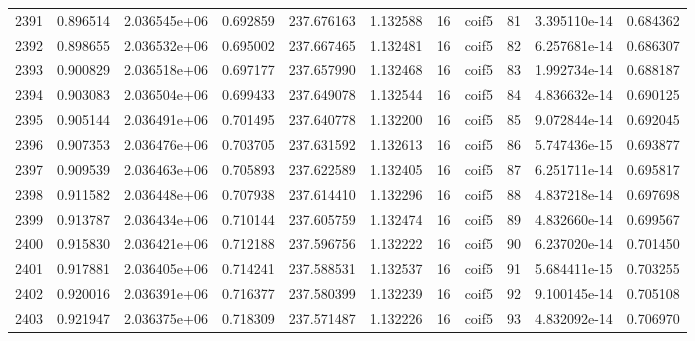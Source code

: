 \begin{tabular}{lrrrrrrlrrr}
2391 &    0.896514 &        2.036545e+06 &  0.692859 &              237.676163 &    1.132588 &      16 &        coif5 &     81 &   3.395110e-14 &      0.684362 \\
2392 &    0.898655 &        2.036532e+06 &  0.695002 &              237.667465 &    1.132481 &      16 &        coif5 &     82 &   6.257681e-14 &      0.686307 \\
2393 &    0.900829 &        2.036518e+06 &  0.697177 &              237.657990 &    1.132468 &      16 &        coif5 &     83 &   1.992734e-14 &      0.688187 \\
2394 &    0.903083 &        2.036504e+06 &  0.699433 &              237.649078 &    1.132544 &      16 &        coif5 &     84 &   4.836632e-14 &      0.690125 \\
2395 &    0.905144 &        2.036491e+06 &  0.701495 &              237.640778 &    1.132200 &      16 &        coif5 &     85 &   9.072844e-14 &      0.692045 \\
2396 &    0.907353 &        2.036476e+06 &  0.703705 &              237.631592 &    1.132613 &      16 &        coif5 &     86 &   5.747436e-15 &      0.693877 \\
2397 &    0.909539 &        2.036463e+06 &  0.705893 &              237.622589 &    1.132405 &      16 &        coif5 &     87 &   6.251711e-14 &      0.695817 \\
2398 &    0.911582 &        2.036448e+06 &  0.707938 &              237.614410 &    1.132296 &      16 &        coif5 &     88 &   4.837218e-14 &      0.697698 \\
2399 &    0.913787 &        2.036434e+06 &  0.710144 &              237.605759 &    1.132474 &      16 &        coif5 &     89 &   4.832660e-14 &      0.699567 \\
2400 &    0.915830 &        2.036421e+06 &  0.712188 &              237.596756 &    1.132222 &      16 &        coif5 &     90 &   6.237020e-14 &      0.701450 \\
2401 &    0.917881 &        2.036405e+06 &  0.714241 &              237.588531 &    1.132537 &      16 &        coif5 &     91 &   5.684411e-15 &      0.703255 \\
2402 &    0.920016 &        2.036391e+06 &  0.716377 &              237.580399 &    1.132239 &      16 &        coif5 &     92 &   9.100145e-14 &      0.705108 \\
2403 &    0.921947 &        2.036375e+06 &  0.718309 &              237.571487 &    1.132226 &      16 &        coif5 &     93 &   4.832092e-14 &      0.706970 \\

\end{tabular}
